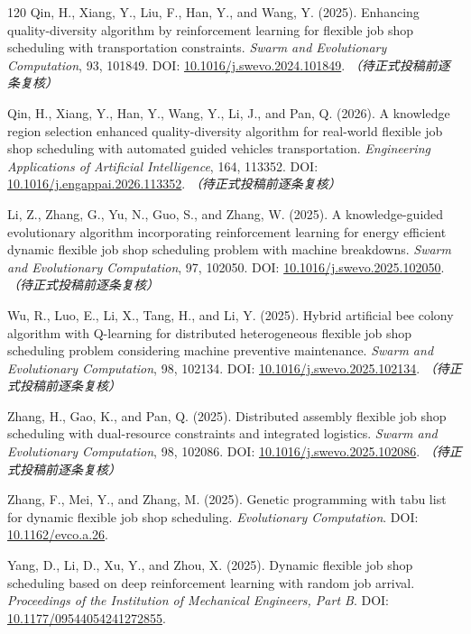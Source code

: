 \documentclass[UTF8,a4paper,11pt]{ctexart}
\begin{document}
\begin{thebibliography}{120}
Qin, H., Xiang, Y., Liu, F., Han, Y., and Wang, Y. (2025). Enhancing quality-diversity algorithm by reinforcement learning for flexible job shop scheduling with transportation constraints. \emph{Swarm and Evolutionary Computation}, 93, 101849.
\newblock DOI: \href{https://doi.org/10.1016/j.swevo.2024.101849}{10.1016/j.swevo.2024.101849}. \textit{（待正式投稿前逐条复核）}

Qin, H., Xiang, Y., Han, Y., Wang, Y., Li, J., and Pan, Q. (2026). A knowledge region selection enhanced quality-diversity algorithm for real-world flexible job shop scheduling with automated guided vehicles transportation. \emph{Engineering Applications of Artificial Intelligence}, 164, 113352.
\newblock DOI: \href{https://doi.org/10.1016/j.engappai.2026.113352}{10.1016/j.engappai.2026.113352}. \textit{（待正式投稿前逐条复核）}

Li, Z., Zhang, G., Yu, N., Guo, S., and Zhang, W. (2025). A knowledge-guided evolutionary algorithm incorporating reinforcement learning for energy efficient dynamic flexible job shop scheduling problem with machine breakdowns. \emph{Swarm and Evolutionary Computation}, 97, 102050.
\newblock DOI: \href{https://doi.org/10.1016/j.swevo.2025.102050}{10.1016/j.swevo.2025.102050}. \textit{（待正式投稿前逐条复核）}

Wu, R., Luo, E., Li, X., Tang, H., and Li, Y. (2025). Hybrid artificial bee colony algorithm with Q-learning for distributed heterogeneous flexible job shop scheduling problem considering machine preventive maintenance. \emph{Swarm and Evolutionary Computation}, 98, 102134.
\newblock DOI: \href{https://doi.org/10.1016/j.swevo.2025.102134}{10.1016/j.swevo.2025.102134}. \textit{（待正式投稿前逐条复核）}

Zhang, H., Gao, K., and Pan, Q. (2025). Distributed assembly flexible job shop scheduling with dual-resource constraints and integrated logistics. \emph{Swarm and Evolutionary Computation}, 98, 102086.
\newblock DOI: \href{https://doi.org/10.1016/j.swevo.2025.102086}{10.1016/j.swevo.2025.102086}. \textit{（待正式投稿前逐条复核）}

Zhang, F., Mei, Y., and Zhang, M. (2025). Genetic programming with tabu list for dynamic flexible job shop scheduling. \emph{Evolutionary Computation}.
\newblock DOI: \href{https://doi.org/10.1162/evco.a.26}{10.1162/evco.a.26}.

Yang, D., Li, D., Xu, Y., and Zhou, X. (2025). Dynamic flexible job shop scheduling based on deep reinforcement learning with random job arrival. \emph{Proceedings of the Institution of Mechanical Engineers, Part B}.
\newblock DOI: \href{https://doi.org/10.1177/09544054241272855}{10.1177/09544054241272855}.


\end{thebibliography}
\end{document}
